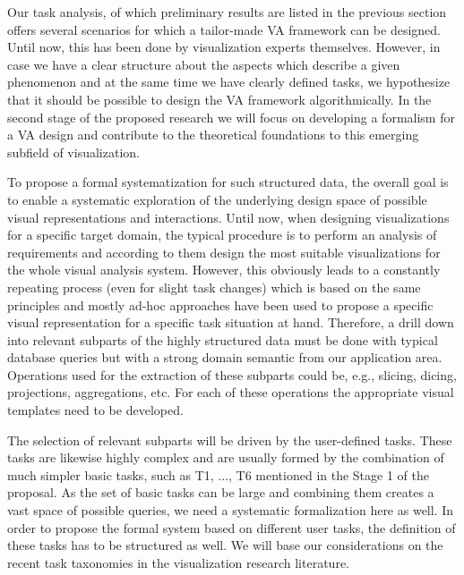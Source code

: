 \documentclass[11pt,a4paper,titlepage,oneside,onecolumn]{article}
\begin{document}
Our task analysis, of which preliminary results are listed in the previous section offers several scenarios for which a tailor-made VA framework can be designed. Until now, this has been done by visualization experts themselves. However, in case we have a clear structure about the aspects which describe a given phenomenon and at the same time we have clearly defined tasks, we hypothesize that it should be possible to design the VA framework algorithmically. In the second stage of the proposed research we will focus on developing a formalism for a VA design and contribute to the theoretical foundations to this emerging subfield of visualization. 

To propose a formal systematization for such structured data, the overall goal is to enable a systematic exploration of the underlying design space of possible visual representations and interactions.
Until now, when designing visualizations for a specific target domain, the typical procedure is to perform an analysis of requirements and according to them design the most suitable visualizations for the whole visual analysis system. 
However, this obviously leads to a constantly repeating process (even for slight task changes) which is based on the same principles and mostly ad-hoc approaches have been used to propose a specific visual representation for a specific task situation at hand.
Therefore, a drill down into relevant subparts of the highly structured data must be done with typical database queries but with a strong domain semantic from our application area. 
Operations used for the extraction of these subparts could be, e.g., slicing, dicing, projections, aggregations, etc. 
For each of these operations the appropriate visual templates need to be developed.

The selection of relevant subparts will be driven by the user-defined tasks.
These tasks are likewise highly complex and are usually formed by the combination of much simpler basic tasks, such as T1, ..., T6 mentioned in the Stage 1 of the proposal. 
As the set of basic tasks can be large and combining them creates a vast space of possible queries, we need a systematic formalization here as well.
In order to propose the formal system based on different user tasks, the definition of these tasks has to be structured as well. We will base our considerations on the recent task taxonomies in the visualization research literature. 
\end{document}
